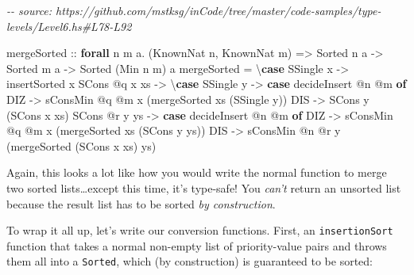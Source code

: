 \documentclass[]{article}
\newenvironment{Shaded}{}{}
\newcommand{\CommentTok}[1]{\textcolor[rgb]{0.38,0.63,0.69}{\textit{#1}}}
\newcommand{\DataTypeTok}[1]{\textcolor[rgb]{0.56,0.13,0.00}{#1}}
\newcommand{\KeywordTok}[1]{\textcolor[rgb]{0.00,0.44,0.13}{\textbf{#1}}}
\newcommand{\NormalTok}[1]{#1}
\newcommand{\OperatorTok}[1]{\textcolor[rgb]{0.40,0.40,0.40}{#1}}
\newcommand{\OtherTok}[1]{\textcolor[rgb]{0.00,0.44,0.13}{#1}}
\begin{document}
\begin{Shaded}
\begin{Highlighting}[]
\CommentTok{{-}{-} source: https://github.com/mstksg/inCode/tree/master/code{-}samples/type{-}levels/Level6.hs\#L78{-}L92}

\OtherTok{mergeSorted ::}
  \KeywordTok{forall}\NormalTok{ n m a}\OperatorTok{.}
\NormalTok{  (}\DataTypeTok{KnownNat}\NormalTok{ n, }\DataTypeTok{KnownNat}\NormalTok{ m) }\OtherTok{=\textgreater{}}
  \DataTypeTok{Sorted}\NormalTok{ n a }\OtherTok{{-}\textgreater{}}
  \DataTypeTok{Sorted}\NormalTok{ m a }\OtherTok{{-}\textgreater{}}
  \DataTypeTok{Sorted}\NormalTok{ (}\DataTypeTok{Min}\NormalTok{ n m) a}
\NormalTok{mergeSorted }\OtherTok{=}\NormalTok{ \textbackslash{}}\KeywordTok{case}
  \DataTypeTok{SSingle}\NormalTok{ x }\OtherTok{{-}\textgreater{}}\NormalTok{ insertSorted x}
  \DataTypeTok{SCons} \OperatorTok{@}\NormalTok{q x xs }\OtherTok{{-}\textgreater{}}\NormalTok{ \textbackslash{}}\KeywordTok{case}
    \DataTypeTok{SSingle}\NormalTok{ y }\OtherTok{{-}\textgreater{}} \KeywordTok{case}\NormalTok{ decideInsert }\OperatorTok{@}\NormalTok{n }\OperatorTok{@}\NormalTok{m }\KeywordTok{of}
      \DataTypeTok{DIZ} \OtherTok{{-}\textgreater{}}\NormalTok{ sConsMin }\OperatorTok{@}\NormalTok{q }\OperatorTok{@}\NormalTok{m x (mergeSorted xs (}\DataTypeTok{SSingle}\NormalTok{ y))}
      \DataTypeTok{DIS} \OtherTok{{-}\textgreater{}} \DataTypeTok{SCons}\NormalTok{ y (}\DataTypeTok{SCons}\NormalTok{ x xs)}
    \DataTypeTok{SCons} \OperatorTok{@}\NormalTok{r y ys }\OtherTok{{-}\textgreater{}} \KeywordTok{case}\NormalTok{ decideInsert }\OperatorTok{@}\NormalTok{n }\OperatorTok{@}\NormalTok{m }\KeywordTok{of}
      \DataTypeTok{DIZ} \OtherTok{{-}\textgreater{}}\NormalTok{ sConsMin }\OperatorTok{@}\NormalTok{q }\OperatorTok{@}\NormalTok{m x (mergeSorted xs (}\DataTypeTok{SCons}\NormalTok{ y ys))}
      \DataTypeTok{DIS} \OtherTok{{-}\textgreater{}}\NormalTok{ sConsMin }\OperatorTok{@}\NormalTok{n }\OperatorTok{@}\NormalTok{r y (mergeSorted (}\DataTypeTok{SCons}\NormalTok{ x xs) ys)}
\end{Highlighting}
\end{Shaded}

Again, this looks a lot like how you would write the normal function to merge
two sorted lists\ldots except this time, it's type-safe! You \emph{can't} return
an unsorted list because the result list has to be sorted \emph{by
construction}.

To wrap it all up, let's write our conversion functions. First, an
\texttt{insertionSort} function that takes a normal non-empty list of
priority-value pairs and throws them all into a \texttt{Sorted}, which (by
construction) is guaranteed to be sorted:
\end{document}
